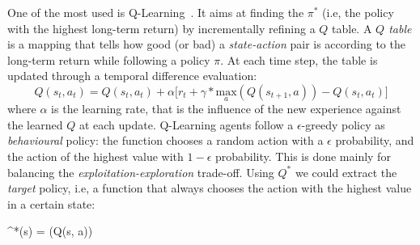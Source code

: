 %
One of the most used is Q-Learning~\cite{DBLP:journals/ml/WatkinsD92}. 
 It aims at finding the $\pi^*$ 
 (i.e, the policy with the highest long-term return) 
 by incrementally refining a $Q$ table. %
%
A \emph{$Q$ table} is a mapping 
 that tells how good (or bad) a \emph{state-action} pair is 
 according to the long-term return while following a policy $\pi$.
%
At each time step, 
 the table is updated through a temporal difference evaluation:
\begin{equation}
Q(s_t, a_t) = Q(s_t, a_t) + \alpha  \big[ r_t + \gamma * \underset{a}{\text{max}}(Q(s_{t+1}, a)) - Q(s_t, a_t)\big]
\end{equation}
where $\alpha$ is the learning rate, 
 that is the influence of the new experience 
 against the learned $Q$ at each update.
%
Q-Learning agents follow a $\epsilon$-greedy policy 
 as \emph{behavioural} policy: 
 the function chooses a random action with a $\epsilon$ probability, 
 and the action of the highest value with $1-\epsilon$ probability. 
%
This is done mainly for balancing 
 the \emph{exploitation-exploration} trade-off. 
%
Using $Q^*$ we could extract the \emph{target} policy,  
 i.e, a function that always chooses the action with the highest value in a certain state:
\begin{iequation}
\pi^*(s) = (Q(s, a))
\end{iequation}

